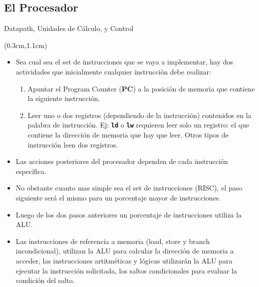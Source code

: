 \documentclass[table,dvipsnames,aspectratio=169]{beamer}
\begin{document}
\subsection{El Procesador}
\begin{frame}{Datapath, Unidades de Cálculo, y Control}
 \begin{textblock*}{\textwidth}(0.3cm,1.1cm)
  \begin{itemize}[<+(1)->]\justifying
   \item Sea cual sea el set de instrucciones que se vaya a implementar, \textcolor{furfiBlue}{hay dos actividades que inicialmente cualquier instrucción debe realizar}:
   \begin{enumerate}\justifying
    \item Apuntar el Program Counter (\textbf{PC}) a la posición de memoria que contiene la siguiente instrucción.
    \item Leer uno o dos registros (dependiendo de la instrucción) contenidos en la palabra de instrucción. Ej: \textbf{\texttt{ld}} o \textbf{\texttt{lw}} requieren leer solo un registro: el que contiene la dirección de memoria que hay que leer. Otros tipos de instrucción leen dos registros.
   \end{enumerate}
   \item Las acciones posteriores del procesador dependen de cada \textcolor{furfiBlue}{instrucción específica}.
   \item No obstante cuanto \textcolor{furfiBlue}{mas simple} sea el set de instrucciones (RISC), el paso siguiente será \textcolor{furfiBlue}{el mismo} para un porcentaje mayor de instrucciones.
   \item Luego de los dos pasos anteriores un porcentaje de instrucciones \textcolor{furfiBlue}{utiliza la ALU}.
   \item Las instrucciones de \textcolor{furfiBlue}{referencia a memoria} (load, store y branch incondicional), utilizan la ALU para calcular la dirección de memoria a acceder, las instrucciones artitméticas y lógicas utilizarán la ALU para ejecutar la instrucción solicitada, los \textcolor{furfiBlue}{saltos condicionales} para evaluar la condición del salto. 
  \end{itemize}
 \end{textblock*}
\end{frame}
 
\end{document}
